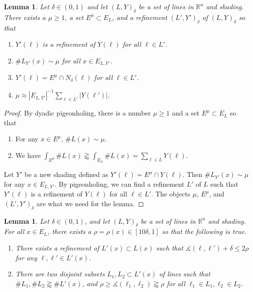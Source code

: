 \documentclass{amsart}
\numberwithin{equation}{section}
\newtheorem{lemma}[theorem]{Lemma}
\newcommand{\de}{\delta}
\newcommand{\ZR}{\mathbb{R}}
\newcommand{\ang}{\measuredangle}
\begin{document}
\begin{lemma}
\label{rich-point-refinement}
Let $\de\in(0,1)$ and let $(L,Y)_\delta$ be a set of lines in $\ZR^n$ and shading.
There exists a $\mu\geq1$, a set $E^\mu\subset E_L$, and a  refinement $(L',Y')_\de$ of $(L,Y)_\de$ so that 
\begin{enumerate}
    \item $Y'(\ell)$ is a refinement of $Y(\ell)$ for all $\ell\in L'$.
    \item $\#L_{Y'}(x)\sim\mu$ for all $x\in E_{L,Y'}$.
    \item $Y'(\ell)= E^\mu\cap N_\de(\ell)$ for all $\ell\in L'$.
    \item $\mu\approx |E_{L,Y'}|^{-1}\sum_{\ell\in L'}|Y(\ell')|$.
\end{enumerate}
\end{lemma}
\begin{proof}
By dyadic pigeonholing, there is a number $\mu\geq1$ and a set $E^\mu\subset E_L$ so that
\begin{enumerate}
    \item For any $x\in E^\mu$, $\#L(x)\sim \mu$.
    \item We have $\int_{E^\mu}\# L(x)\gtrapprox \int_{E_L}\# L(x)=\sum_{\ell\in L}Y(\ell)$.
\end{enumerate}
Let $Y'$ be a new shading defined as $Y'(\ell)=E^\mu\cap Y(\ell)$. Then $\#L_{Y'}(x)\sim\mu$ for any $x\in E_{L,Y'}$. 
By pigeonholing, we can find a refinement $L'$ of $L$ such that $Y'(\ell)$ is a refinement of $Y(\ell)$ for all $\ell\in L'$.
The objects $\mu$, $E^\mu$, and $(L',Y')_\de$ are what we need for the lemma.
\end{proof}




\begin{lemma}
\label{broad-narrow-lem}
Let $\de\in(0,1)$, and let $(L,Y)_\delta$ be a set of lines in $\ZR^n$ and shading. 
For all $x\in E_L$, there exists a $\rho=\rho(x)\in[10\de,1]$ so that the following is true.

\begin{enumerate}
    \item There exists a refinement of $L'(x)\subset L(x)$ such that $\ang(\ell,\ell')+\de\leq 2\rho$ for any $\ell,\ell'\in L'(x)$.
    \item There are two disjoint subsets $L_1,L_2\subset L'(x)$ of lines such that $\# L_1, \# L_2\gtrapprox \# L'(x)$, and $\rho\geq\ang(\ell_1,\ell_2)\gtrapprox \rho$ for all $\ell_1\in L_1,\ell_2\in L_2$.
\end{enumerate}
\end{lemma}
\end{document}
